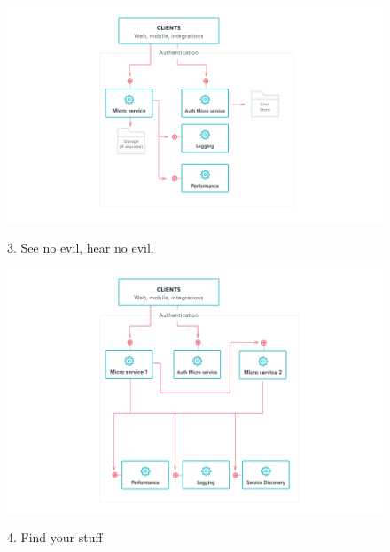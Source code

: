 \documentclass[aspectratio=169]{beamer}
\begin{document}
\begin{frame}
	\begin{figure}
		\caption{3. See no evil, hear no evil.}
		\includegraphics[height=.8\textheight]{img/3.png}
		\label{img:seeNoEvilHearNoEvil}
	\end{figure}
\end{frame}

\begin{frame}
	\begin{figure}
		\caption{4. Find your stuff}
		\includegraphics[height=.8\textheight]{img/4.png}
		\label{img:findYourStuff}
	\end{figure}
\end{frame}
\end{document}
